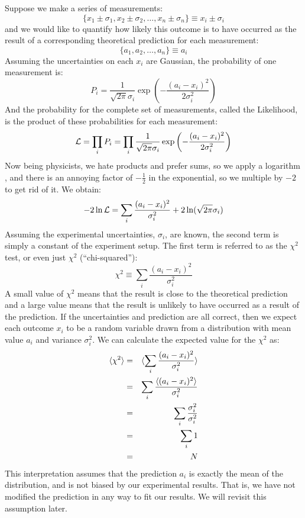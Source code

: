 \documentclass[12pt,oneside]{book}
\begin{document}
Suppose we make a series of measurements:
\begin{displaymath}
\{x_1 \pm \sigma_1, x_2 \pm \sigma_2, \ldots, x_n \pm \sigma_n \} \equiv x_i \pm \sigma_i
\end{displaymath}
and we would like to quantify how likely this outcome is to have occurred as the result of a corresponding theoretical prediction for each measurement:
\begin{displaymath}
\{a_1, a_2, \ldots, a_n \} \equiv a_i
\end{displaymath}
Assuming the uncertainties on each $x_i$ are Gaussian, the probability of one measurement is:
\begin{displaymath}
P_i = \frac{1}{\sqrt{2 \pi} \sigma_i}  \exp\left( - \frac{(a_i-x_i)^2}{2\sigma_i^2}\right)
\end{displaymath}
And the probability for the complete set of measurements, called the Likelihood, is the product of these probabilities for each measurement:
\begin{displaymath}
{\cal L} = \prod_i P_i = \prod_i \frac{1}{\sqrt{2 \pi} \sigma_i}  \exp\left( - \frac{(a_i-x_i)^2}{2\sigma_i^2}\right)
\end{displaymath}
Now being physicists, we hate products and prefer sums, so we apply a logarithm , and there is an annoying factor of $-\frac{1}{2}$ in the exponential, so we multiple by $-2$ to get rid of it.  We obtain:
\begin{equation}
-2 \ln {\cal L} = \sum_i \frac{(a_i-x_i)^2}{\sigma_i^2} + 2 \ln(\sqrt{2\pi}\sigma_i)
\end{equation}
Assuming the experimental uncertainties, $\sigma_i$, are known, the
second term is simply a constant of the experiment setup.  The first
term is referred to as the $\chi^2$ test, or even just $\chi^2$ (``chi-squared''):
\begin{equation}
\chi^2 \equiv \sum_i \frac{(a_i-x_i)^2}{\sigma_i^2} 
\end{equation}
A small value of $\chi^2$ means that the result is close to the
theoretical prediction and a large value means that the result is
unlikely to have occurred as a result of the prediction.  If the
uncertainties and prediction are all correct,
then we expect each outcome $x_i$ to be a random variable drawn from a distribution with mean value $a_i$ and variance $\sigma_i^2$.  We can calculate the expected value for the $\chi^2$ as:
\begin{eqnarray*}
  \braket{\chi^2} &=& \braket{\sum_i \frac{(a_i-x_i)^2}{\sigma_i^2}} \\
&=& \sum_i \frac{\braket{(a_i-x_i)^2}}{\sigma_i^2} \\
&=& \sum_i \frac{\sigma_i^2}{\sigma_i^2} \\
&=& \sum_i 1 \\
&=& N \\
\end{eqnarray*}
This interpretation assumes that the prediction $a_i$ is exactly the
mean of the distribution, and is not biased by our experimental
results.  That is, we have not modified the prediction in any way to
fit our results.  We will revisit this assumption later.
\end{document}
